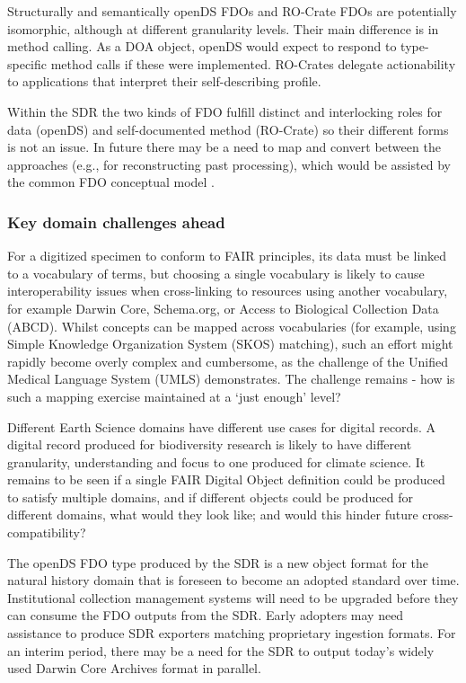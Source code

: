 Structurally and semantically openDS FDOs and RO-Crate FDOs are
potentially isomorphic, although at different granularity levels. Their
main difference is in method calling. As a DOA object, openDS would
expect to respond to type-specific method calls if these were
implemented. RO-Crates delegate actionability to applications that
interpret their self-describing profile.

Within the SDR the two kinds of FDO fulfill distinct and interlocking
roles for data (openDS) and self-documented method (RO-Crate) so their
different forms is not an issue. In future there may be a need to map
and convert between the approaches (e.g., for reconstructing past
processing), which would be assisted by the common FDO conceptual model
\cite{bonino2019}.

\hypertarget{key-domain-challenges-ahead}{%
\subsubsection{Key domain challenges
ahead}\label{key-domain-challenges-ahead}}

For a digitized specimen to conform to FAIR principles, its data must be
linked to a vocabulary of terms, but choosing a single vocabulary is
likely to cause interoperability issues when cross-linking to resources
using another vocabulary, for example Darwin Core, Schema.org, or Access
to Biological Collection Data (ABCD). Whilst concepts can be mapped
across vocabularies (for example, using Simple Knowledge Organization
System (SKOS) matching), such an effort might rapidly become overly
complex and cumbersome, as the challenge of the Unified Medical Language
System (UMLS) demonstrates. The challenge remains - how is such a
mapping exercise maintained at a `just enough' level?

Different Earth Science domains have different use cases for digital
records. A digital record produced for biodiversity research is likely
to have different granularity, understanding and focus to one produced
for climate science. It remains to be seen if a single FAIR Digital
Object definition could be produced to satisfy multiple domains, and if
different objects could be produced for different domains, what would
they look like; and would this hinder future cross-compatibility?

The openDS FDO type produced by the SDR is a new object format for the
natural history domain that is foreseen to become an adopted standard
over time. Institutional collection management systems will need to be
upgraded before they can consume the FDO outputs from the SDR. Early
adopters may need assistance to produce SDR exporters matching
proprietary ingestion formats. For an interim period, there may be a
need for the SDR to output today's widely used Darwin Core Archives
format in parallel.

